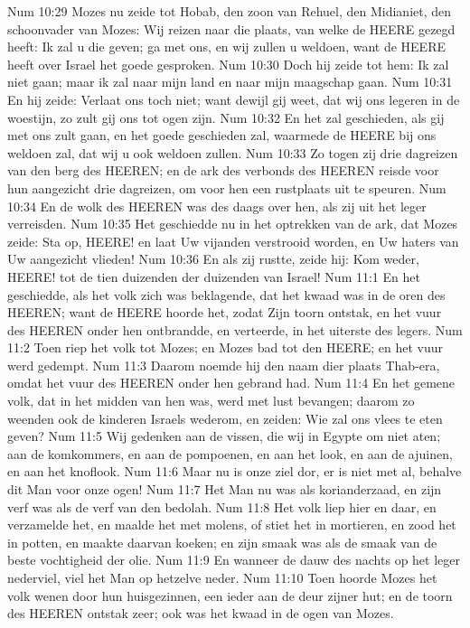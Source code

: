 Num 10:29  Mozes nu zeide tot Hobab, den zoon van Rehuel, den Midianiet, den schoonvader van Mozes: Wij reizen naar die plaats, van welke de HEERE gezegd heeft: Ik zal u die geven; ga met ons, en wij zullen u weldoen, want de HEERE heeft over Israel het goede gesproken.
Num 10:30  Doch hij zeide tot hem: Ik zal niet gaan; maar ik zal naar mijn land en naar mijn maagschap gaan.
Num 10:31  En hij zeide: Verlaat ons toch niet; want dewijl gij weet, dat wij ons legeren in de woestijn, zo zult gij ons tot ogen zijn.
Num 10:32  En het zal geschieden, als gij met ons zult gaan, en het goede geschieden zal, waarmede de HEERE bij ons weldoen zal, dat wij u ook weldoen zullen.
Num 10:33  Zo togen zij drie dagreizen van den berg des HEEREN; en de ark des verbonds des HEEREN reisde voor hun aangezicht drie dagreizen, om voor hen een rustplaats uit te speuren.
Num 10:34  En de wolk des HEEREN was des daags over hen, als zij uit het leger verreisden.
Num 10:35  Het geschiedde nu in het optrekken van de ark, dat Mozes zeide: Sta op, HEERE! en laat Uw vijanden verstrooid worden, en Uw haters van Uw aangezicht vlieden!
Num 10:36  En als zij rustte, zeide hij: Kom weder, HEERE! tot de tien duizenden der duizenden van Israel!
Num 11:1  En het geschiedde, als het volk zich was beklagende, dat het kwaad was in de oren des HEEREN; want de HEERE hoorde het, zodat Zijn toorn ontstak, en het vuur des HEEREN onder hen ontbrandde, en verteerde, in het uiterste des legers.
Num 11:2  Toen riep het volk tot Mozes; en Mozes bad tot den HEERE; en het vuur werd gedempt.
Num 11:3  Daarom noemde hij den naam dier plaats Thab-era, omdat het vuur des HEEREN onder hen gebrand had.
Num 11:4  En het gemene volk, dat in het midden van hen was, werd met lust bevangen; daarom zo weenden ook de kinderen Israels wederom, en zeiden: Wie zal ons vlees te eten geven?
Num 11:5  Wij gedenken aan de vissen, die wij in Egypte om niet aten; aan de komkommers, en aan de pompoenen, en aan het look, en aan de ajuinen, en aan het knoflook.
Num 11:6  Maar nu is onze ziel dor, er is niet met al, behalve dit Man voor onze ogen!
Num 11:7  Het Man nu was als korianderzaad, en zijn verf was als de verf van den bedolah.
Num 11:8  Het volk liep hier en daar, en verzamelde het, en maalde het met molens, of stiet het in mortieren, en zood het in potten, en maakte daarvan koeken; en zijn smaak was als de smaak van de beste vochtigheid der olie.
Num 11:9  En wanneer de dauw des nachts op het leger nederviel, viel het Man op hetzelve neder.
Num 11:10  Toen hoorde Mozes het volk wenen door hun huisgezinnen, een ieder aan de deur zijner hut; en de toorn des HEEREN ontstak zeer; ook was het kwaad in de ogen van Mozes.

